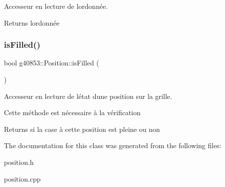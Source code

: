 Accesseur en lecture de l\textquotesingle{}ordonnée. 

\begin{DoxyReturn}{Returns}
l\textquotesingle{}ordonnée 
\end{DoxyReturn}
\hypertarget{classg40853_1_1_position_a7f72d7ae6ea209e2a65856b1065990fa}{}\label{classg40853_1_1_position_a7f72d7ae6ea209e2a65856b1065990fa} 
\subsubsection{\texorpdfstring{is\+Filled()}{isFilled()}}
{\footnotesize\ttfamily bool g40853\+::\+Position\+::is\+Filled (\begin{DoxyParamCaption}{ }\end{DoxyParamCaption})\hspace{0.3cm}{\ttfamily [inline]}}



Accesseur en lecture de l\textquotesingle{}état d\textquotesingle{}une position sur la grille. 

Cette méthode est nécessaire à la vérification

\begin{DoxyReturn}{Returns}
si la case à cette position est pleine ou non 
\end{DoxyReturn}


The documentation for this class was generated from the following files\+:\begin{DoxyCompactItemize}
\item 
position.\+h\item 
position.\+cpp\end{DoxyCompactItemize}
